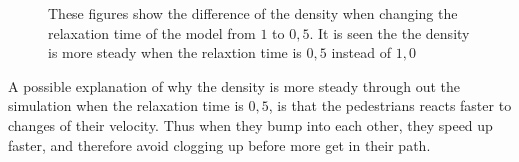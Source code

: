 \begin{figure}[h]
\centering
{}
\caption{These figures show the difference of the density when changing the relaxation time of the model from $1$ to $0,5$.
It is seen the the density is more steady when the relaxtion time is $0,5$ instead of $1,0$}
\label{fig:comparison_of_timestep}
\end{figure}

A possible explanation of why the density is more steady through out the simulation when the relaxation time is $0,5$,
is that the pedestrians reacts faster to changes of their velocity. Thus when they bump into each other, they speed up
faster, and therefore avoid clogging up before more get in their path.